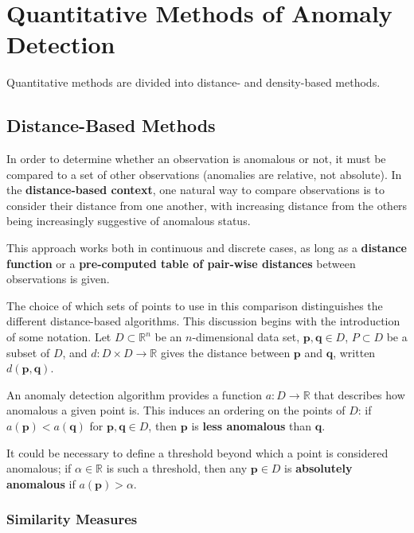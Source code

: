 \newpage
\section{Quantitative Methods of Anomaly Detection}\label{Section:2}
Quantitative methods are divided into distance- and density-based methods. 
\subsection{Distance-Based Methods}
In order to determine whether an observation is anomalous or not, it must be compared to a set of other observations (anomalies are relative, not absolute). In the \textbf{distance-based context}, one natural way to compare observations is  to consider their distance from one another, with increasing distance from the others being increasingly suggestive of anomalous status.

This approach works both in continuous and discrete cases, as long as a \textbf{distance function} or a \textbf{pre-computed table of pair-wise distances} between observations is given. 

The choice of which sets of points to use in this comparison distinguishes the different distance-based algorithms.
\newl This discussion begins with the introduction of some notation.
Let $D \subset \mathbb{R}^n$ be an $n$-dimensional data set, 
$\mathbf{p},\mathbf{q}\in D$, 
$P \subset D$ be a subset of $D$, 
and $d: D \times D \to \mathbb{R}$ gives the distance between $\mathbf{p}$ and $\mathbf{q}$, written $d(\mathbf{p},\mathbf{q})$.

An anomaly detection algorithm provides a function $a : D \to \mathbb{R}$ that describes how anomalous a given point is. This induces an ordering on the points of $D$: 
if $a(\mathbf{p}) < a(\mathbf{q})$ for $\mathbf{p},\mathbf{q} \in D$, then $\mathbf{p}$ is \textbf{less anomalous} than $\mathbf{q}$.

It could be necessary to define a threshold beyond which a point is considered anomalous; if $\alpha \in \mathbb{R}$ is such a threshold, then any $\mathbf{p} \in D$ is \textbf{absolutely anomalous} if  $a(\mathbf{p}) > \alpha$.

\subsubsection*{Similarity Measures}


